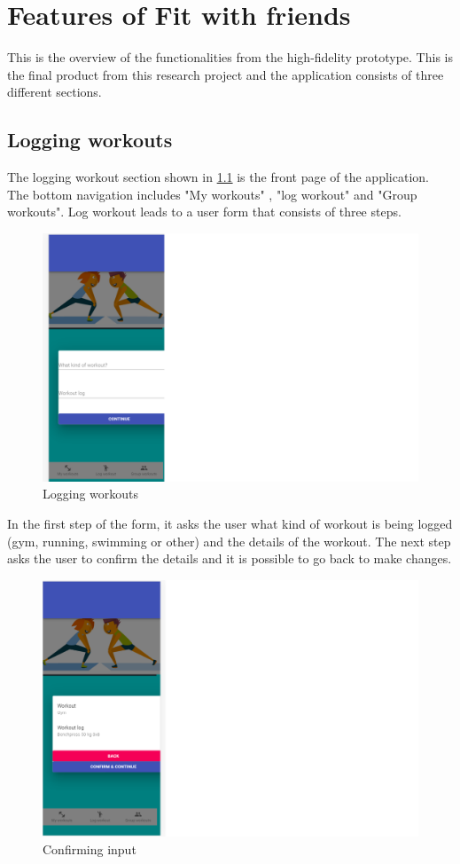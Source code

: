 \chapter{Features of Fit with friends} \label{fitwithf}
This is the overview of the functionalities from the high-fidelity prototype. This is the final product from this research project and the application consists of three different sections.

\section{Logging workouts}
The logging workout section shown in \ref{logworks} is the front page of the application. The bottom navigation includes "My workouts" , "log workout" and "Group workouts". Log workout leads to a user form that consists of three steps. 
\begin{figure}[H]
    \flushright
    \includegraphics[scale=0.6]{figures/loggingworkouts.png}
    \caption{Logging workouts}
    \label{logworks}
    \end{figure}
In the first step of the form, it asks the user what kind of workout is being logged (gym, running, swimming or other) and the details of the workout. The next step asks the user to confirm the details and it is possible to go back to make changes.

    \begin{figure}[H]
    \flushright
    \includegraphics[scale=0.6]{figures/confirmworkouts.png}
    \caption{Confirming input}
\end{figure}


